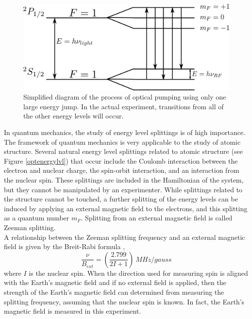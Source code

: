 \documentclass[11pt,letterpaper]{article}
\begin{document}
\begin{figure}
    \centering
    \includegraphics[width=\textwidth]{figures/opticalpumping.png}
    \caption{Simplified diagram of the process of optical pumping using only one
        large energy jump. In the actual experiment, transitions from all of the
        other energy levels will occur.}
    \label{optpump}
\end{figure}

In quantum mechanics, the study of energy level splittings is of high
importance. The framework of quantum mechanics is very applicable to the study
of atomic structure. Several natural energy level splittings related to atomic
structure (see Figure \ref{optenergylvl}) that occur include the Coulomb
interaction between the electron and nuclear charge, the spin-orbit interaction,
and an interaction from the nuclear spin. These splittings are included in the
Hamiltonian of the system, but they cannot be manipulated by an experimenter.
While splittings related to the structure cannot be touched, a further splitting
of the energy levels can be induced by applying an external magnetic field to
the electrons, and this splitting as a quantum number $m_F$. Splitting from an
external magnetic field is called Zeeman splitting.\\

A relationship between the Zeeman splitting frequency and an external magnetic
field is given by the Breit-Rabi formula \cite{LabManual},
\begin{equation}
    \frac{\nu}{B_{ext}} = \left(\frac{2.799}{2I+1}\right)\ MHz/gauss
    \label{breitrabi}
\end{equation}
where $I$ is the nuclear spin. When the direction used for measuring spin is
aligned with the Earth's magnetic field and if no external field is applied,
then the strength of the Earth's magnetic field can determined from measuring
the splitting frequency, assuming that the nuclear spin is known. In fact, the
Earth's magnetic field is measured in this experiment.\\
\end{document}
